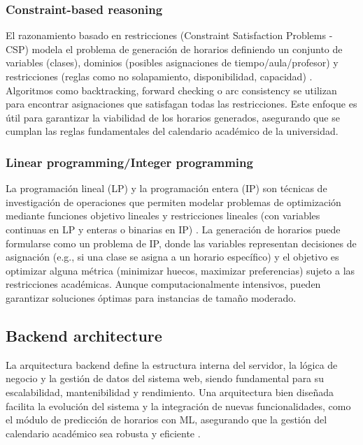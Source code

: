 \subsubsection{Constraint-based reasoning}
El razonamiento basado en restricciones (Constraint Satisfaction Problems - CSP) modela el problema de generación de horarios definiendo un conjunto de variables (clases), dominios (posibles asignaciones de tiempo/aula/profesor) y restricciones (reglas como no solapamiento, disponibilidad, capacidad) \parencite{Rossi2006}.
Algoritmos como backtracking, forward checking o arc consistency se utilizan para encontrar asignaciones que satisfagan todas las restricciones. Este enfoque es útil para garantizar la viabilidad de los horarios generados, asegurando que se cumplan las reglas fundamentales del calendario académico de la universidad.

\subsubsection{Linear programming/Integer programming}
La programación lineal (LP) y la programación entera (IP) son técnicas de investigación de operaciones que permiten modelar problemas de optimización mediante funciones objetivo lineales y restricciones lineales (con variables continuas en LP y enteras o binarias en IP) \parencite{Winston2004}.
La generación de horarios puede formularse como un problema de IP, donde las variables representan decisiones de asignación (e.g., si una clase se asigna a un horario específico) y el objetivo es optimizar alguna métrica (minimizar huecos, maximizar preferencias) sujeto a las restricciones académicas. Aunque computacionalmente intensivos, pueden garantizar soluciones óptimas para instancias de tamaño moderado.

\subsection{Backend architecture}
La arquitectura backend define la estructura interna del servidor, la lógica de negocio y la gestión de datos del sistema web, siendo fundamental para su escalabilidad, mantenibilidad y rendimiento.
Una arquitectura bien diseñada facilita la evolución del sistema y la integración de nuevas funcionalidades, como el módulo de predicción de horarios con ML, asegurando que la gestión del calendario académico sea robusta y eficiente \parencite{Richards2015}.

